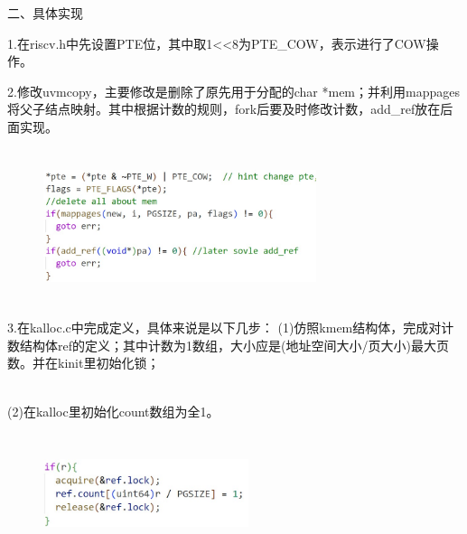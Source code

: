 \documentclass[12pt]{article}
\begin{document}
\begin{Large}
	\noindent 二、具体实现\par
\end{Large}
1.在riscv.h中先设置PTE位，其中取1<<8为PTE\_COW，表示进行了COW操作。\par
2.修改uvmcopy，主要修改是删除了原先用于分配的char *mem；并利用mappages将父子结点映射。其中根据计数的规则，fork后要及时修改计数，add\_ref放在后面实现。
\begin{figure}[H]
    \centering
    \includegraphics[height=4.5cm,width=8cm]{lab5-1.jpg}
\end{figure}\par
3.在kalloc.c中完成定义，具体来说是以下几步：
\newpage
\noindent(1)仿照kmem结构体，完成对计数结构体ref的定义；其中计数为1数组，大小应是(地址空间大小/页大小)最大页数。并在kinit里初始化锁；
\begin{figure}[!h]
    \centering
    \hfill
\end{figure}\\
\noindent(2)在kalloc里初始化count数组为全1。
\begin{figure}[H]
    \centering
    \includegraphics[height=3.5cm,width=6cm]{lab5-6.jpg}
\end{figure}
\end{document}
